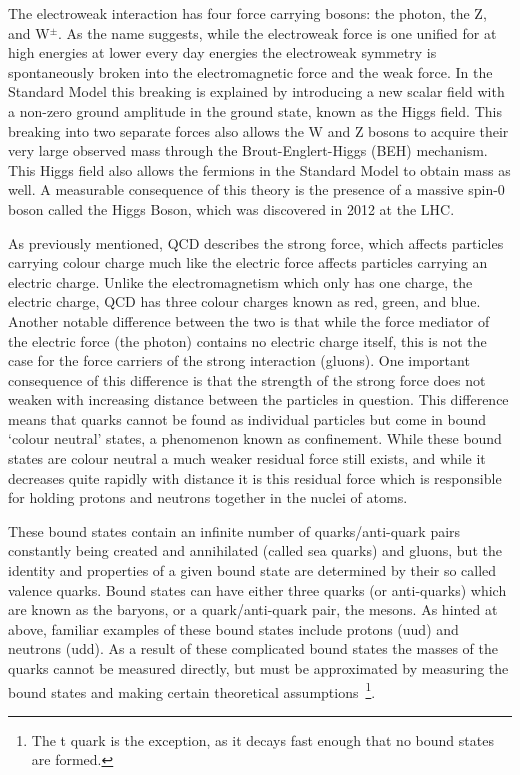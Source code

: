 The electroweak interaction has four force carrying bosons: the photon, the Z, and W$^{\pm}$.  
As the name suggests, while the electroweak force is one unified for at high energies at lower every day energies the electroweak symmetry is spontaneously broken into the electromagnetic force and the weak force.  
In the Standard Model this breaking is explained by introducing a new scalar field with a non-zero ground amplitude in the ground state, known as the Higgs field.  
This breaking into two separate forces also allows the W and Z bosons to acquire their very large observed mass through the Brout-Englert-Higgs (BEH) mechanism.  
This Higgs field also allows the fermions in the Standard Model to obtain mass as well.  
A measurable consequence of this theory is the presence of a massive spin-0 boson called the Higgs Boson, which was discovered in 2012 at the \gls{LHC}.  

As previously mentioned, \gls{QCD} describes the strong force, which affects particles carrying colour charge much like the electric force affects particles carrying an electric charge.  
Unlike the electromagnetism which only has one charge, the electric charge, \gls{QCD} has three colour charges known as red, green, and blue.  
Another notable difference between the two is that while the force mediator of the electric force (the photon) contains no electric charge itself, this is not the case for the force carriers of the strong interaction (gluons).  
One important consequence of this difference is that the strength of the strong force does not weaken with increasing distance between the particles in question.  
This difference means that quarks cannot be found as individual particles but come in bound `colour neutral' states, a phenomenon known as confinement.  
While these bound states are colour neutral a much weaker residual force still exists, and while it decreases quite rapidly with distance it is this residual force which is responsible for holding protons and neutrons together in the nuclei of atoms.  

These bound states contain an infinite number of quarks/anti-quark pairs constantly being created and annihilated (called sea quarks) and gluons, but the identity and properties of a given bound state are determined by their so called valence quarks.  
Bound states can have either three quarks (or anti-quarks) which are known as the baryons, or a quark/anti-quark pair, the mesons.  
As hinted at above, familiar examples of these bound states include protons (uud) and neutrons (udd).  
As a result of these complicated bound states the masses of the quarks cannot be measured directly, but must be approximated by measuring the bound states and making certain theoretical assumptions~\footnote{The t quark is the exception, as it decays fast enough that no bound states are formed.}.
 


